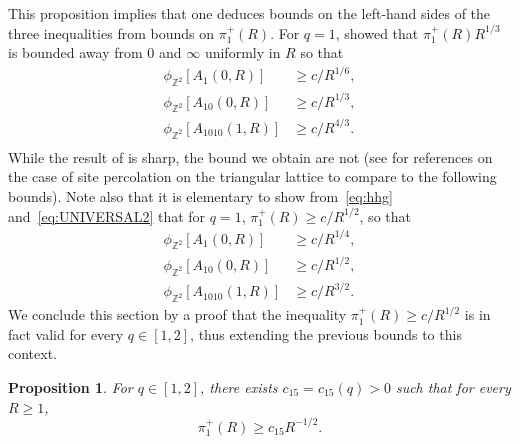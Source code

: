 \documentclass[a4paper,oneside,11pt]{article}
\newtheorem{proposition}[theorem]{Proposition}
\numberwithin{equation}{section}
\numberwithin{equation}{section}
\numberwithin{equation}{section}
\newcommand{\bbZ}{\mathbb{Z}}
\begin{document}
This proposition implies that one deduces bounds on the left-hand sides of the three inequalities from bounds on $\pi_1^+(R)$. For $q=1$, \cite{PonIkh} showed that $\pi_1^+(R)R^{1/3}$ is bounded away from 0 and $\infty $ uniformly in $R$ so that 
\begin{align*}
   \phi_{\bbZ^2}[A_1(0,R)] &\geq c/R^{1/6},\\
   \phi_{\bbZ^2}[A_{10}(0,R)] &\geq c/R^{1/3},\\
   \phi_{\bbZ^2}[A_{1010}(1,R)] &\geq c/R^{4/3}.\\
\end{align*}
While the result of \cite{PonIkh} is sharp, the bound we obtain are not  (see \cite{BefDum13} for references on the case of site percolation on the triangular lattice to compare to the following bounds).
Note also that it is  elementary to show from~\eqref{eq:hhg} and~\eqref{eq:UNIVERSAL2} that for $q=1$, $\pi_1^+(R)\ge c/R^{1/2}$,
so that
    \begin{align*}
        \phi_{\bbZ^2}[A_1(0,R)] &\geq c/R^{1/4},\\
        \phi_{\bbZ^2}[A_{10}(0,R)] &\geq c/R^{1/2},\\
        \phi_{\bbZ^2}[A_{1010}(1,R)] &\geq c/R^{3/2}.
    \end{align*}
We conclude this section by a proof that the inequality $\pi_1^+(R)\ge c/R^{1/2}$ is in fact valid for every $q\in[1,2]$, thus extending the previous bounds to this context.

\begin{proposition}\label{prop:one_arm1/2}
    For $q\in[1,2]$, there exists $c_{15}=c_{15}(q)>0$ such that for every $R\ge1$,
    \begin{equation*}
    	\pi_1^+(R)\ge c_{15}R^{-1/2}.
    \end{equation*}
\end{proposition}
\end{document}
